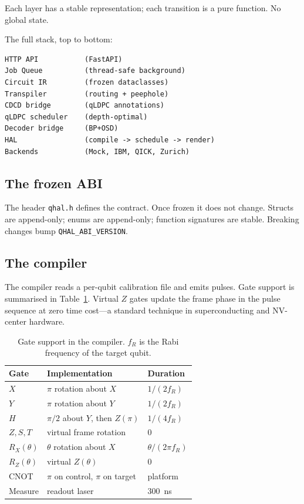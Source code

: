 \documentclass[aps,prApplied,twocolumn,superscriptaddress,floatfix]{revtex4-2}
\begin{document}
Each layer has a stable representation; each transition is a pure
function. No global state.

The full stack, top to bottom:
\begin{lstlisting}
HTTP API           (FastAPI)
Job Queue          (thread-safe background)
Circuit IR         (frozen dataclasses)
Transpiler         (routing + peephole)
CDCD bridge        (qLDPC annotations)
qLDPC scheduler    (depth-optimal)
Decoder bridge     (BP+OSD)
HAL                (compile -> schedule -> render)
Backends           (Mock, IBM, QICK, Zurich)
\end{lstlisting}

\subsection{The frozen ABI}

The header \texttt{qhal.h} defines the contract. Once frozen it does
not change. Structs are append-only; enums are append-only; function
signatures are stable. Breaking changes bump
\texttt{QHAL\_ABI\_VERSION}.

\subsection{The compiler}

The compiler reads a per-qubit calibration file and emits pulses. Gate
support is summarised in Table~\ref{tab:gates}. Virtual $Z$ gates update
the frame phase in the pulse sequence at zero time cost---a standard
technique in superconducting and NV-center hardware.

\begin{table}[b]
\caption{\label{tab:gates}Gate support in the compiler. $f_R$ is the
Rabi frequency of the target qubit.}
\begin{ruledtabular}
\begin{tabular}{lll}
Gate & Implementation & Duration \\
\hline
$X$    & $\pi$ rotation about $X$    & $1/(2 f_R)$ \\
$Y$    & $\pi$ rotation about $Y$    & $1/(2 f_R)$ \\
$H$    & $\pi/2$ about $Y$, then $Z(\pi)$ & $1/(4 f_R)$ \\
$Z,S,T$ & virtual frame rotation       & $0$ \\
$R_X(\theta)$ & $\theta$ rotation about $X$ & $\theta/(2\pi f_R)$ \\
$R_Z(\theta)$ & virtual $Z(\theta)$       & $0$ \\
CNOT   & $\pi$ on control, $\pi$ on target & platform \\
Measure & readout laser               & \SI{300}{\nano\second} \\
\end{tabular}
\end{ruledtabular}
\end{table}
\end{document}
